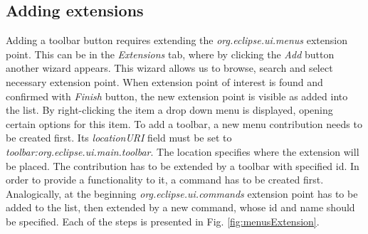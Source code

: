 \subsection{Adding extensions}

Adding a toolbar button requires extending the \textit{org.eclipse.ui.menus} extension point. This can be in the \textit{Extensions} tab, where by clicking the \textit{Add} button another wizard appears. This wizard allows us to browse, search and select necessary extension point. When extension point of interest is found and confirmed with \textit{Finish} button, the new extension point is visible as added into the list. By right-clicking the item a drop down menu is displayed, opening certain options for this item. To add a toolbar, a new menu contribution needs to be created first. Its \textit{locationURI} field must be set to \textit{toolbar:org.eclipse.ui.main.toolbar}. The location specifies where the extension will be placed. The contribution has to be extended by a toolbar with specified id. In order to provide a functionality to it, a command has to be created first. Analogically, at the beginning \textit{org.eclipse.ui.commands} extension point has to be added to the list, then extended by a new command, whose id and name should be specified. Each of the steps is presented in Fig. \ref{fig:menusExtension}.

